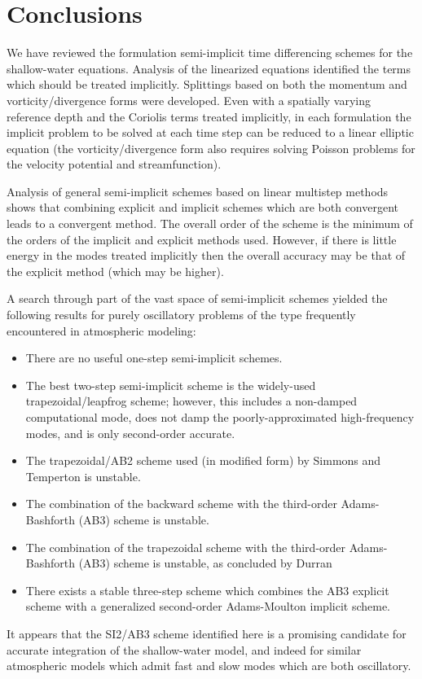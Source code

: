 \documentclass[12pt]{article}
\begin{document}
\pagebreak[4]
\section{Conclusions\label{sec:conclusions}}
\setcounter{equation}{0}

We have reviewed the formulation semi-implicit time differencing schemes for
the shallow-water equations.  Analysis of the linearized equations identified
the terms which should be treated implicitly.  Splittings based on both the
momentum and vorticity/divergence forms were developed.  Even with a spatially
varying reference depth and the Coriolis terms treated implicitly, in each
formulation the implicit problem to be solved at each time step can be reduced
to a linear elliptic equation (the vorticity/divergence form also requires
solving Poisson problems for the velocity potential and streamfunction).

Analysis of general semi-implicit schemes based on linear multistep methods
shows that combining explicit and implicit schemes which are both convergent 
leads to a convergent method.  The overall order of the scheme is the minimum
of the orders of the implicit and explicit methods used.  However, if there is
little energy in the modes treated implicitly then the overall accuracy may be
that of the explicit method (which may be higher).

A search through part of the vast space of semi-implicit schemes
yielded the following results for purely oscillatory problems of the
type frequently encountered in atmospheric modeling:
{\setlength{\parskip}{0pt}
\begin{itemize}
\setlength{\itemsep}{2pt} \setlength{\parsep}{0pt}
\setlength{\topsep}{0pt} \setlength{\partopsep}{0pt}
\item There are no useful one-step semi-implicit schemes.
\item The best two-step semi-implicit scheme is the widely-used
trapezoidal/leapfrog scheme; however, this includes a non-damped computational
mode, does not damp the poorly-approximated high-frequency modes, and is 
only second-order accurate.
\item The trapezoidal/AB2 scheme used (in modified form) by 
Simmons and Temperton \cite{Simmons_Temperton97} is unstable.
\item The combination of the backward scheme with the third-order
Adams-Bashforth (AB3) scheme is unstable.
\item The combination of the trapezoidal scheme with the third-order
Adams-Bashforth (AB3) scheme is unstable, as concluded by 
Durran \cite{Durran91}
\item There exists a stable three-step scheme which combines the AB3
explicit scheme with a generalized second-order Adams-Moulton implicit scheme.
\end{itemize} 
}
\noindent
It appears that the SI2/AB3 scheme identified here is a promising candidate
for accurate integration of the shallow-water model, and indeed for similar 
atmospheric models which admit fast and slow modes which are both oscillatory.
\end{document}
